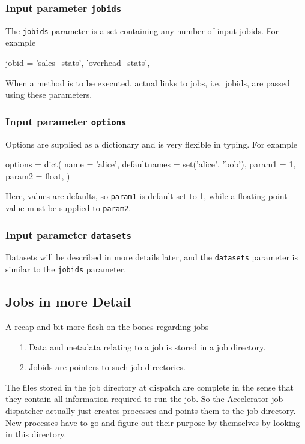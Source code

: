 \documentclass[a4paper]{article}
\begin{document}
\subsubsection*{Input parameter \texttt{jobids}}
The \texttt{jobids} parameter is a set containing any number of input
jobids.  For example
\begin{python}
  jobid = {'sales_stats', 'overhead_stats',}
\end{python}
When a method is to be executed, actual links to jobs, i.e.\ jobids,
are passed using these parameters.


\subsubsection*{Input parameter \texttt{options}}
Options are supplied as a dictionary and is very flexible in typing.  For example
\begin{python}
  options = dict(
    name = 'alice',
    defaultnames = set('alice', 'bob'),
    param1 = 1,
    param2 = float,
  )
\end{python}
Here, values are defaults, so \texttt{param1} is default set to 1,
while a floating point value must be supplied to \texttt{param2}.

\subsubsection*{Input parameter \texttt{datasets}}
Datasets will be described in more details later, and the
\texttt{datasets} parameter is similar to the \texttt{jobids}
parameter.

\clearpage



\subsection{Jobs in more Detail}
A recap and bit more flesh on the bones regarding jobs
\begin{itemize}
\item[1.]  Data and metadata relating to a job is stored in a job directory.
\item[2.]  Jobids are pointers to such job directories.
\end{itemize}
The files stored in the job directory at dispatch are complete in the
sense that they contain all information required to run the job.  So
the Accelerator job dispatcher actually just creates processes and
points them to the job directory.  New processes have to go and figure
out their purpose by themselves by looking in this directory.
\end{document}
